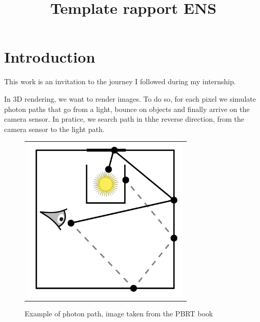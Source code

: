 \documentclass{classeENS}
\title{Template rapport ENS} %
\begin{document}

\matiere{} 
\motif{}

\tuteurpcp{}

        
\fairemarges %


\tabledematieres %

\section{Introduction}

This work is an invitation to the journey I followed during my internship. 

\par In 3D rendering, we want to render images. To do so, for each pixel 
we simulate photon paths that go from a light, bounce on objects and finally 
arrive on the camera sensor. In pratice, we search path in thhe reverse direction, 
from the camera sensor to the light path.

\begin{figure}[H]
    \centering
    \caption{Example of photon path, image taken from the PBRT book \cite{10.5555/1854996}}
    \begin{tabular}{c}
    \includegraphics[width=80mm]{image/initialPhoton.png}
    \end{tabular}
\end{figure}
\end{document}
